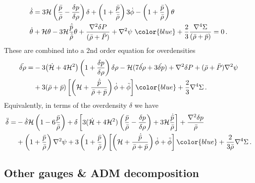 \begin{align}
    &\dot{\delta}= 3\mathcal{H}\left(\frac{\bar{p}}{\bar{\rho}}-\frac{\delta p}{\delta\rho}\right)\delta + \left(1+\frac{\bar{p}}{\bar{\rho}}\right)3\dot{\phi} - \left(1+\frac{\bar{p}}{\bar{\rho}}\right)\theta\, \label{eq:continuity_overdensity_form}\\
    &\dot{\theta}+ \mathcal{H}\theta-3\mathcal{H}\frac{\dot{\bar{p}}}{\dot{\bar{\rho}}}\theta+\frac{\nabla^2\delta P}{(\bar{\rho}+\bar{P})}+\nabla^2\psi\,\,{\color{blue}+\frac{2}{3}\frac{\nabla^4 \Sigma}{(\bar{\rho}+\bar{p})}}=0\,.\label{eq:euler_divergence_form}
\end{align}
These are combined into a 2nd order equation for overdensities
\begin{align}
\begin{aligned}
    \ddot{\delta\rho}=&-3\big(\dot{\mathcal{H}}+4\mathcal{H}^2\big)\left(1+\frac{\delta p}{\delta\rho}\right)\delta\rho
    -\mathcal{H}(7\dot{\delta\rho}+3\dot{\delta p})+\nabla^2\delta P +(\bar{\rho}+\bar{P})\nabla^2\psi\\
    &+3(\bar{\rho}+\bar{p})\left[\left(\mathcal{H}+\frac{\dot{\bar{p}}}{\bar{\rho}+\bar{p}}\right)\dot{\phi}+\ddot{\phi}\right] {\color{blue}+ \frac{2}{3}\nabla^4\Sigma}\,.
\end{aligned}
\end{align}
Equivalently, in terms of the overdensity $\delta$ we have
\begin{align}
\begin{aligned}
    \ddot{\delta}=&-\dot{\delta}\mathcal{H}\left(1-6\frac{\bar{p}}{\bar{\rho}}\right)
    +\delta\left[3(\dot{\mathcal{H}}+4\mathcal{H}^2)\left(\frac{\bar{p}}{\bar{\rho}}-\frac{\delta p}{\delta\rho}\right)+3\mathcal{H}\frac{\dot{\bar{p}}}{\bar{\rho}}\right]
    +\frac{\nabla^2\delta p}{\bar{\rho}}\\
    & +\left(1+\frac{\bar{p}}{\bar{\rho}}\right)\nabla^2\psi
    +3\left(1+\frac{\bar{p}}{\bar{\rho}}\right)\left[\left(\mathcal{H}+\frac{\dot{\bar{p}}}{\bar{\rho}+\bar{p}}\right)\dot{\phi}+\ddot{\phi}\right] {\color{blue}+ \frac{2}{3\bar{\rho}}\nabla^4\Sigma}\,.
\end{aligned}
\end{align}



\subsection{Other gauges \& ADM decomposition}

